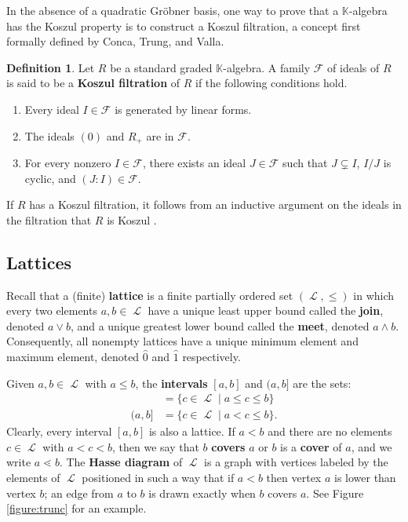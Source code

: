 \documentclass[11pt, reqno]{amsart}
\renewcommand{\hat}[1]{\widehat{#1}}
\newcommand{\kk}{\mathbb{K}}					%
\DeclareMathOperator{\LL}{\mathcal{L}}
\newcommand{\term}[1]{\textbf{\textsf{#1}}}
\theoremstyle{definition}
\newtheorem{defn}[thm]{Definition}
\numberwithin{equation}{section}
\numberwithin{table}{section}
\begin{document}
\begin{spacing}{1.1}
In the absence of a quadratic Gr\"obner basis, one way to prove that a $\kk$-algebra has the Koszul property is to construct a Koszul filtration, a concept first formally defined by Conca, Trung, and Valla.  

\begin{defn} Let $R$ be a standard graded $\kk$-algebra.  A family $\mathcal{F}$ of ideals of $R$ is said to be a \term{Koszul filtration} of $R$ if the following conditions hold.
\begin{enumerate}
    \item Every ideal $I \in \mathcal{F}$ is generated by linear forms.
    \item The ideals $(0)$ and $R_+$ are in $\mathcal{F}$.
    \item For every nonzero $I \in \mathcal{F}$, there exists an ideal $J \in \mathcal{F}$ such that $J \subsetneq I$, $I/J$ is cyclic, and $(J : I) \in \mathcal{F}$.
\end{enumerate}
\end{defn}

If $R$ has a Koszul filtration, it follows from an inductive argument on the ideals in the filtration that $R$ is Koszul \cite[Proposition~1.2]{CTV01}.



\subsection{Lattices}\label{SSlattices}

Recall that a (finite) \term{lattice} is a finite partially ordered set $(\LL,\le)$ in which every two elements $a,b \in \LL$ have a unique least upper bound called the \term{join}, denoted $a \vee b$, and a unique greatest lower bound called the \term{meet}, denoted $a \wedge b$.  Consequently, all nonempty lattices have a unique minimum element and maximum element, denoted $\hat{0}$ and $\hat{1}$ respectively.

Given $a,b \in \LL$ with $a \leq b$, the \term{intervals} $[a,b]$ and $(a, b]$ are the sets: 
\begin{align*}
[a,b] &= \{c \in \LL \mid a \le c \leq b\} \\[1 ex] 
(a,b] &= \{c \in \LL \mid a < c \le b\}.
\end{align*}  
Clearly, every interval $[a, b]$ is also a lattice.  If $a < b$ and there are no elements $c \in \LL$ with $a < c < b$, then we say that $b$ \term{covers} $a$ or $b$ is a \term{cover} of $a$, and we write $a \lessdot b$.  The \term{Hasse diagram} of $\LL$ is a graph with vertices labeled by the elements of $\LL$ positioned in such a way that if $a < b$ then vertex $a$ is lower than vertex $b$; an edge from $a$ to $b$ is drawn exactly when $b$ covers $a$.  See Figure \ref{figure:trunc} for an example.    


\end{spacing}
\end{document}
